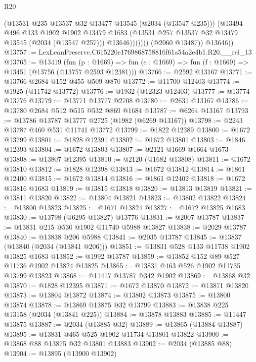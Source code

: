 \begin{lexlean}{R20}
\begin{coremodule}
                      (@13531 @235 @13537 @32 @13477 @13545 (@2034 (@13547 @235)))
                      (@13494
                        @496
                        @133
                        @1902
                        @1902
                        @13479
                        @1683
                        (@13531 @257 @13537 @32 @13479 @13545 (@2034 (@13547 @257)))
                        @13646)))))))
          (@2060 @13487))
        @13646))
@13757 := LexLeanPreserve.C615220e1769868758816f61a54a2e4b1.R20.__rel_13
@13765 := @13419
    (fun (p : @1669) => fun (e : @1669) => fun (f : @1669) => @13451 (@13756 (@13757 @2593 @12381)))
@13766 := @2592 @13167
@13771 := @13766 @2684 @152 @455 @509 @870
@13772 := @11700 @12403
@13774 := @1925 (@11742 @13772)
@13776 := @1932 (@12323 @12403)
@13777 := @13774 @13776
@13779 := @13771 @13777 @2708
@13780 := @2631 @13167
@13786 := @13780 @2684 @512 @515 @532 @869 @1684
@13787 := @6264 @13167
@13793 := @13786 @13787 @13777 @2725 (@1982 (@6269 @13167))
@13798 := @2243 @13787 @460 @531 @11741 @13772
@13799 := @1822 @12389
@13800 := @1672 @13799
@13801 := @1828 @12391
@13802 := @1672 @13801
@13803 := @1846 @12393
@13804 := @1672 @13803
@13807 := @2121 @1669 @1664 @1673
@13808 := @13807 @12395
@13810 := @2120 (@1682 @13808)
@13811 := @1672 @13810
@13812 := @1828 @12398
@13813 := @1672 @13812
@13814 := @1861 @12400
@13815 := @1672 @13814
@13816 := @1861 @12402
@13818 := @1672 @13816 @1683
@13819 := @13815 @13818
@13820 := @13813 @13819
@13821 := @13811 @13820
@13822 := @13804 @13821
@13823 := @13802 @13822
@13824 := @13800 @13823
@13825 := @1671 @13824
@13827 := @1672 @13825 @1683
@13830 := @13798 (@6295 @13827) @13776
@13831 := @2007 @13787
@13837 := @13831 @215 @530 @1902 @11740 @5988 @13827
@13838 := @2029 @13787
@13840 := @13838 @206 @5988
@13841 := @2035 @13787
@13845 := @13837 (@13840 (@2034 (@13841 @206)))
@13851 := @13831 @528 @133 @11738 @1902 @13825 @1683
@13852 := @1992 @13787
@13859 := @13852 @152 @89 @527 @11736 @1902 @13824 @13825
@13865 := @13831 @463 @526 @1902 @11735 @13799 @13823
@13868 := @11417 @13787 @342 @1902
@13869 := @13868 @32
@13870 := @1828 @12395
@13871 := @1672 @13870
@13872 := @13871 @13820
@13873 := @13804 @13872
@13874 := @13802 @13873
@13875 := @13800 @13874
@13878 := @13869 @13875 @32 @13799
@13883 := @13838 @225 @13158 (@2034 (@13841 @225))
@13884 := @13878 @13883
@13885 := @11447 @13875
@13887 := @2034 (@13885 @32)
@13889 := @13865 (@13884 @13887)
@13895 := @13831 @465 @525 @1902 @11734 @13801 @13822
@13900 := @13868 @88 @13875 @32 @13801 @13883
@13902 := @2034 (@13885 @88)
@13904 := @13895 (@13900 @13902)

\end{coremodule}
\end{lexlean}
